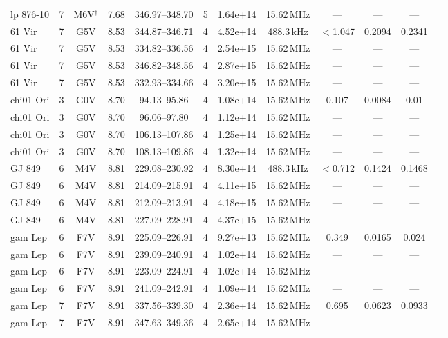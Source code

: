 \documentclass{openjournal}
\begin{document}
\begin{table}
\begin{tabularx}{\textwidth}{@{}l c c c c c c c c c c X@{}}
 lp 876-10 & 7 & M6V$^\dagger$ & 7.68 & 346.97--348.70 & 5 & 1.64e+14 & 15.62\,MHz & --- & --- & --- &  \\
 61 Vir & 7 & G5V & 8.53 & 344.87--346.71 & 4 & 4.52e+14 & 488.3\,kHz & $<$1.047 & 0.2094 & 0.2341 &  \\
 61 Vir & 7 & G5V & 8.53 & 334.82--336.56 & 4 & 2.54e+15 & 15.62\,MHz & --- & --- & --- &  \\
 61 Vir & 7 & G5V & 8.53 & 346.82--348.56 & 4 & 2.87e+15 & 15.62\,MHz & --- & --- & --- &  \\
 61 Vir & 7 & G5V & 8.53 & 332.93--334.66 & 4 & 3.20e+15 & 15.62\,MHz & --- & --- & --- &  \\
 chi01 Ori & 3 & G0V & 8.70 & 94.13--95.86 & 4 & 1.08e+14 & 15.62\,MHz & 0.107 & 0.0084 & 0.01 &  \\
 chi01 Ori & 3 & G0V & 8.70 & 96.06--97.80 & 4 & 1.12e+14 & 15.62\,MHz & --- & --- & --- &  \\
 chi01 Ori & 3 & G0V & 8.70 & 106.13--107.86 & 4 & 1.25e+14 & 15.62\,MHz & --- & --- & --- &  \\
 chi01 Ori & 3 & G0V & 8.70 & 108.13--109.86 & 4 & 1.32e+14 & 15.62\,MHz & --- & --- & --- &  \\
 GJ 849 & 6 & M4V & 8.81 & 229.08--230.92 & 4 & 8.30e+14 & 488.3\,kHz & $<$0.712 & 0.1424 & 0.1468 &  \\
 GJ 849 & 6 & M4V & 8.81 & 214.09--215.91 & 4 & 4.11e+15 & 15.62\,MHz & --- & --- & --- &  \\
 GJ 849 & 6 & M4V & 8.81 & 212.09--213.91 & 4 & 4.18e+15 & 15.62\,MHz & --- & --- & --- &  \\
 GJ 849 & 6 & M4V & 8.81 & 227.09--228.91 & 4 & 4.37e+15 & 15.62\,MHz & --- & --- & --- &  \\
 gam Lep & 6 & F7V & 8.91 & 225.09--226.91 & 4 & 9.27e+13 & 15.62\,MHz & 0.349 & 0.0165 & 0.024 &  \\
 gam Lep & 6 & F7V & 8.91 & 239.09--240.91 & 4 & 1.02e+14 & 15.62\,MHz & --- & --- & --- &  \\
 gam Lep & 6 & F7V & 8.91 & 223.09--224.91 & 4 & 1.02e+14 & 15.62\,MHz & --- & --- & --- &  \\
 gam Lep & 6 & F7V & 8.91 & 241.09--242.91 & 4 & 1.09e+14 & 15.62\,MHz & --- & --- & --- &  \\
 gam Lep & 7 & F7V & 8.91 & 337.56--339.30 & 4 & 2.36e+14 & 15.62\,MHz & 0.695 & 0.0623 & 0.0933 &  \\
 gam Lep & 7 & F7V & 8.91 & 347.63--349.36 & 4 & 2.65e+14 & 15.62\,MHz & --- & --- & --- &  \\
\hline
\end{tabularx}
\end{table}
\end{document}
